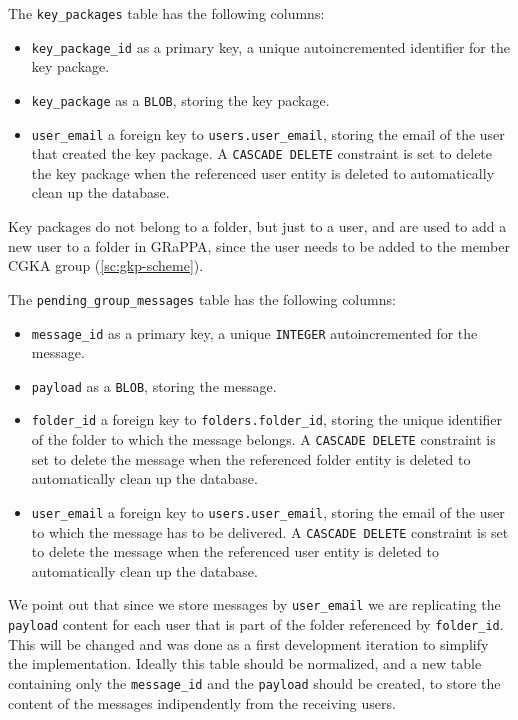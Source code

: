 The \texttt{key\_packages} table has the following columns:
\begin{itemize}
    \item \texttt{key\_package\_id} as a primary key, a unique autoincremented identifier for the key package.
    \item \texttt{key\_package} as a \texttt{BLOB}, storing the key package.
    \item \texttt{user\_email} a foreign key to \texttt{users.user\_email}, storing the email of the user that created the key package. A \texttt{CASCADE DELETE} constraint is set to delete the key package when the referenced user entity is deleted to automatically clean up the database.
\end{itemize}
Key packages do not belong to a folder, but just to a user, and are used to
add a new user to a folder in GRaPPA, since the user needs to be added to the
member CGKA group (\cref{sc:gkp-scheme}).

The \texttt{pending\_group\_messages} table has the following columns:
\begin{itemize}
    \item \texttt{message\_id} as a primary key, a unique \texttt{INTEGER} autoincremented for the message.
    \item \texttt{payload} as a \texttt{BLOB}, storing the message.
    \item \texttt{folder\_id} a foreign key to \texttt{folders.folder\_id}, storing the unique identifier of the folder to which the message belongs. A \texttt{CASCADE DELETE} constraint is set to delete the message when the referenced folder entity is deleted to automatically clean up the database.
    \item \texttt{user\_email} a foreign key to \texttt{users.user\_email}, storing the email of the user to which the message has to be delivered. A \texttt{CASCADE DELETE} constraint is set to delete the message when the referenced user entity is deleted to automatically clean up the database.
\end{itemize}
We point out that since we store messages by \texttt{user\_email} we are replicating
the \texttt{payload} content for each user that is part of the folder 
referenced by \texttt{folder\_id}. This will be changed and was done as a first
development iteration to simplify the implementation. Ideally this table should be
normalized, and a new table containing only the \texttt{message\_id}
and the \texttt{payload} should be created, to store the content of the messages
indipendently from the receiving users.


